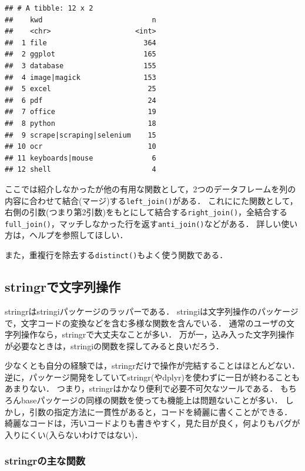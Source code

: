 \documentclass[
]{article}
\begin{document}
\begin{verbatim}
## # A tibble: 12 x 2
##    kwd                          n
##    <chr>                    <int>
##  1 file                       364
##  2 ggplot                     165
##  3 database                   155
##  4 image|magick               153
##  5 excel                       25
##  6 pdf                         24
##  7 office                      19
##  8 python                      18
##  9 scrape|scraping|selenium    15
## 10 ocr                         10
## 11 keyboards|mouse              6
## 12 shell                        4
\end{verbatim}

ここでは紹介しなかったが他の有用な関数として，2つのデータフレームを列の内容に合わせて結合(マージ)する\texttt{left\_join()}がある．
これににた関数として，右側の引数(つまり第2引数)をもとにして結合する\texttt{right\_join()}，全結合する\texttt{full\_join()}，マッチしなかった行を返す\texttt{anti\_join()}などがある．
詳しい使い方は，ヘルプを参照してほしい．

また，重複行を除去する\texttt{distinct()}もよく使う関数である．

\hypertarget{stringr}{%
\subsection{stringrで文字列操作}\label{stringr}}

stringrはstringiパッケージのラッパーである．
stringiは文字列操作のパッケージで，文字コードの変換などを含む多様な関数を含んでいる．
通常のユーザの文字列操作なら，stringrで大丈夫なことが多い．
万が一，込み入った文字列操作が必要なときは，stringiの関数を探してみると良いだろう．

少なくとも自分の経験では，stringrだけで操作が完結することはほとんどない．
逆に，パッケージ開発をしていてstringr(やdplyr)を使わずに一日が終わることもあまりない．
つまり，stringrはかなり便利で必要不可欠なツールである．
もちろんbaseパッケージの同様の関数を使っても機能上は問題ないことが多い．
しかし，引数の指定方法に一貫性があると，コードを綺麗に書くことができる．
綺麗なコードは，汚いコードよりも書きやすく，見た目が良く，何よりもバグが入りにくい(入らないわけではない)．

\hypertarget{stringrux306eux4e3bux306aux95a2ux6570}{%
\subsubsection{stringrの主な関数}\label{stringrux306eux4e3bux306aux95a2ux6570}}
\end{document}
